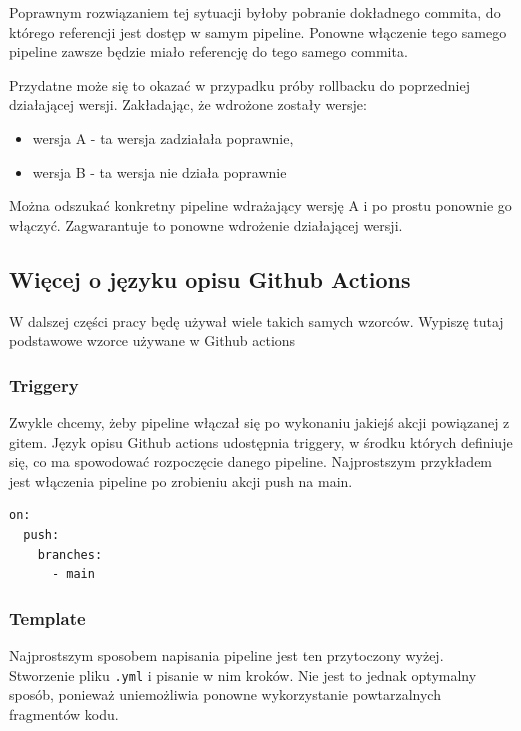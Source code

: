 \documentclass{article}
\begin{document}
Poprawnym rozwiązaniem tej sytuacji byłoby pobranie dokładnego commita, do którego referencji jest dostęp w samym pipeline. Ponowne włączenie tego samego pipeline zawsze będzie miało referencję do tego samego commita.

Przydatne może się to okazać w przypadku próby rollbacku do poprzedniej działającej wersji. Zakładając, że wdrożone zostały wersje:
\begin{itemize}
    \item wersja A - ta wersja zadziałała poprawnie,
    \item wersja B - ta wersja nie działa poprawnie
\end{itemize}

Można odszukać konkretny pipeline wdrażający wersję A i po prostu ponownie go włączyć. Zagwarantuje to ponowne wdrożenie działającej wersji.

\subsection{Więcej o języku opisu Github Actions}

W dalszej części pracy będę używał wiele takich samych wzorców. Wypiszę tutaj podstawowe wzorce używane w Github actions

\subsubsection{Triggery}

Zwykle chcemy, żeby pipeline włączał się po wykonaniu jakiejś akcji powiązanej z gitem. Język opisu Github actions udostępnia triggery, w środku których definiuje się, co ma spowodować rozpoczęcie danego pipeline. Najprostszym przykładem jest włączenia pipeline po zrobieniu akcji push na main.

\begin{lstlisting}[caption=Fragment kodu z triggerem ustawionym na push na main]
on:
  push:
    branches:
      - main
\end{lstlisting}


\subsubsection{Template}

Najprostszym sposobem napisania pipeline jest ten przytoczony wyżej. Stworzenie pliku \lstinline|.yml| i pisanie w nim kroków. Nie jest to jednak optymalny sposób, ponieważ uniemożliwia ponowne wykorzystanie powtarzalnych fragmentów kodu.
\end{document}
